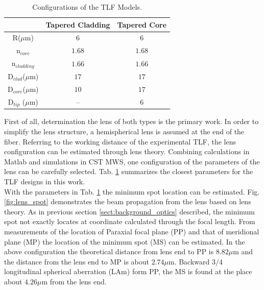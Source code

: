 \begin{table}[!ht]
\caption{Configurations of the TLF Models.}
\centering
\begin{tabular}{ccc}
\hline
							&Tapered Cladding&Tapered Core\\
\hline
R($\mu$m) & $6$						 &$6$	\\
n$_{core}$&$1.68$&$1.68$\\
n$_{cladding}$&$1.66$&$1.66$\\
D$_{clad}$($\mu$m) &	$17$ &	$17$\\
D$_{core}$($\mu$m) & $10$ &	$17$\\
D$_{tip}$ ($\mu$m) & --   &	$6$\\
\hline
\end{tabular}
\label{tab:model_fiber_configuration}
\end{table}
First of all, determination the lens of both types is the primary work. In order to simplify the lens structure, a hemispherical lens is assumed at the end of the fiber. Referring to the working distance of the experimental TLF, the lens configuration can be estimated through lens theory. Combining calculations in Matlab and simulations in CST MWS, one configuration of the parameters of the lens can be carefully selected. Tab. \ref{tab:model_fiber_configuration} summarizes the closest parameters for the TLF designs in this work.\\   

With the parameters in Tab. \ref{tab:model_fiber_configuration} the minimum spot location can be estimated. Fig. \ref{fig:lens_spot} demonstrates the beam propagation from the lens based on lens theory. As in previous section \ref{sect:background_optics} described, the minimum spot not exactly locates at coordinate calculated through the focal length. From measurements of the location of Paraxial focal plane (PP) and that of meridional plane (MP) the location of the minimum spot (MS) can be estimated. In the above configuration the theoretical distance from lens end to PP is $8.82 \mu$m and the distance from the lens end to MP is about $2.74 \mu$m. Backward $3/4$ longitudinal spherical aberration (LAm) form PP, the MS is found at the place about $4.26 \mu$m from the lens end. \\ 

